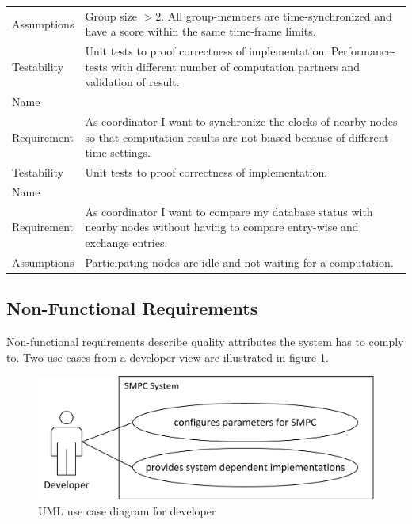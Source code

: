 \begin{table}[!htb]
\begin{tabular}{|l|p{}|}
			Assumptions & Group size $>2$. All group-members are time-synchronized and have a score within the same time-frame limits. \\
			Testability & Unit tests to proof correctness of implementation. Performance-tests with different number of computation partners and validation of result. \\ \midrule
			Name & \funcreq{Clock Synchronization}\label{req:Clock Synchronization} \\ \midrule
			Requirement & As coordinator I want to synchronize the clocks of nearby nodes so that computation results are not biased because of different time settings. \\
			Testability & Unit tests to proof correctness of implementation. \\ \midrule
			Name & \funcreq{Database Synchronization}\label{req:Database Synchronization} \\ \midrule
			Requirement & As coordinator I want to compare my database status with nearby nodes without having to compare entry-wise and exchange entries. \\
			Assumptions & Participating nodes are idle and not waiting for a computation.\\
			\bottomrule
		\end{tabular}
	\end{table}

	\FloatBarrier
	\subsection{Non-Functional Requirements} \label{Non-Functional Requirements}

	Non-functional requirements describe quality attributes the system has to comply to. Two use-cases from a developer view are illustrated in figure \ref{figure:requirements use case developer}.

	\begin{figure}[!htb] %
	\caption{\gls{UML} use case diagram for developer} \label{figure:requirements use case developer}
	\includegraphics[scale=0.85]{figures/use-case-developer.png}
	\end{figure}

